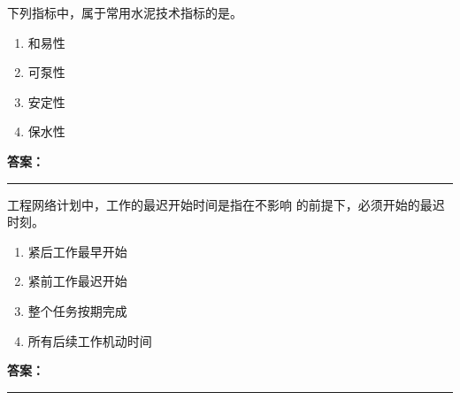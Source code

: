 \documentclass[UTF8,fontset=fandol,11pt]{ctexart}
\newcommand{\answerline}{\textcolor{answerred}{\rule{2.4cm}{0.7pt}}}
\begin{document}
\begin{quizbox}[title={乱序第 193 题｜第四章混凝土结构工程}]

下列指标中，属于常用水泥技术指标的是。\\

\begin{enumerate}[label=\Alph*.]

\item 和易性

\item 可泵性

\item 安定性

\item 保水性

\end{enumerate}

\textbf{\textcolor{answerred}{答案：}} \answerline

\end{quizbox}

\vspace{0.2em}

\begin{quizbox}[title={乱序第 194 题｜第十一章网络计划技术}]

工程网络计划中，工作的最迟开始时间是指在不影响 的前提下，必须开始的最迟时刻。\\

\begin{enumerate}[label=\Alph*.]

\item 紧后工作最早开始

\item 紧前工作最迟开始

\item 整个任务按期完成

\item 所有后续工作机动时间

\end{enumerate}

\textbf{\textcolor{answerred}{答案：}} \answerline

\end{quizbox}

\vspace{0.2em}
\end{document}
